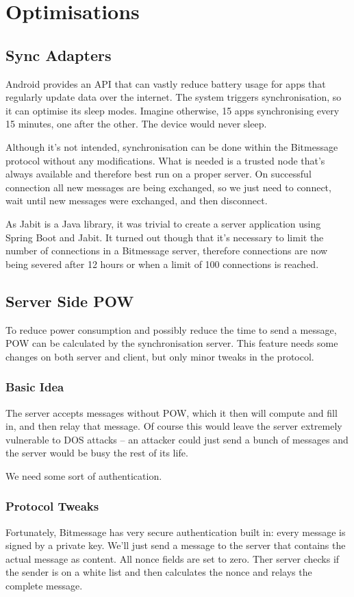 \documentclass{bfh}
\begin{document}
  \section{Optimisations}
  \subsection{Sync Adapters}
  Android provides an API that can vastly reduce battery usage for apps that regularly update data over the internet. The system triggers synchronisation, so it can optimise its sleep modes. Imagine otherwise, 15 apps synchronising every 15 minutes, one after the other. The device would never sleep.

  Although it's not intended, synchronisation can be done within the Bitmessage protocol without any modifications. What is needed is a trusted node that's always available and therefore best run on a proper server. On successful connection all new messages are being exchanged, so we just need to connect, wait until new messages were exchanged, and then disconnect.

  As Jabit is a Java library, it was trivial to create a server application using Spring Boot and Jabit. It turned out though that it's necessary to limit the number of connections in a Bitmessage server, therefore connections are now being severed after 12 hours or when a limit of 100 connections is reached.

  \subsection{Server Side \acl{POW}}
  To reduce power consumption and possibly reduce the time to send a message, \ac{POW} can be calculated by the synchronisation server. This feature needs some changes on both server and client, but only minor tweaks in the protocol.
  
  \subsubsection{Basic Idea}
  The server accepts messages without \ac{POW}, which it then will compute and fill in, and then relay that message. Of course this would leave the server extremely vulnerable to \ac{DOS} attacks -- an attacker could just send a bunch of messages and the server would be busy the rest of its life.
  
  We need some sort of authentication.

  \subsubsection{Protocol Tweaks}
  Fortunately, Bitmessage has very secure authentication built in: every message is signed by a private key. We'll just send a message to the server that contains the actual message as content. All nonce fields are set to zero. Ther server checks if the sender is on a white list and then calculates the nonce and relays the complete message.

  \newpage
  
  
\end{document}
